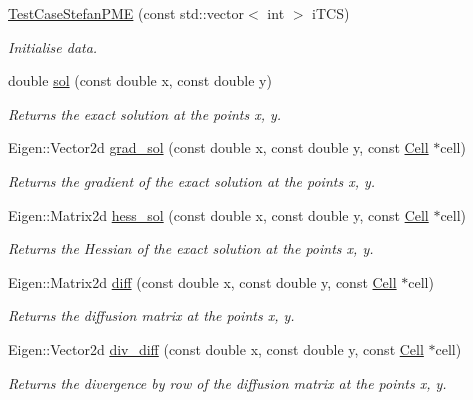 \begin{DoxyCompactItemize}
\item 
\hyperlink{classTestCaseStefanPME_a5e456675c254048c7a087d4d2f1466c8}{Test\+Case\+Stefan\+P\+ME} (const std\+::vector$<$ int $>$ i\+T\+CS)
\begin{DoxyCompactList}\small\item\em Initialise data. \end{DoxyCompactList}\item 
double \hyperlink{classTestCaseStefanPME_adb724181b45dfacc154d6bbc2fe66aed}{sol} (const double x, const double y)
\begin{DoxyCompactList}\small\item\em Returns the exact solution at the points x, y. \end{DoxyCompactList}\item 
Eigen\+::\+Vector2d \hyperlink{classTestCaseStefanPME_a9beffb89d9ccf0e0092df1eac1beac6e}{grad\+\_\+sol} (const double x, const double y, const \hyperlink{classHArDCore2D_1_1Cell}{Cell} $\ast$cell)
\begin{DoxyCompactList}\small\item\em Returns the gradient of the exact solution at the points x, y. \end{DoxyCompactList}\item 
Eigen\+::\+Matrix2d \hyperlink{classTestCaseStefanPME_a54e4ead2ac700269fd940dcdd739f517}{hess\+\_\+sol} (const double x, const double y, const \hyperlink{classHArDCore2D_1_1Cell}{Cell} $\ast$cell)
\begin{DoxyCompactList}\small\item\em Returns the Hessian of the exact solution at the points x, y. \end{DoxyCompactList}\item 
Eigen\+::\+Matrix2d \hyperlink{classTestCaseStefanPME_ae99d679c24d05b295bcd01538c175a6d}{diff} (const double x, const double y, const \hyperlink{classHArDCore2D_1_1Cell}{Cell} $\ast$cell)
\begin{DoxyCompactList}\small\item\em Returns the diffusion matrix at the points x, y. \end{DoxyCompactList}\item 
Eigen\+::\+Vector2d \hyperlink{classTestCaseStefanPME_a8c85fa8375fbc6c42461dd4562d53ce3}{div\+\_\+diff} (const double x, const double y, const \hyperlink{classHArDCore2D_1_1Cell}{Cell} $\ast$cell)
\begin{DoxyCompactList}\small\item\em Returns the divergence by row of the diffusion matrix at the points x, y. \end{DoxyCompactList}\item 

\end{DoxyCompactItemize}
